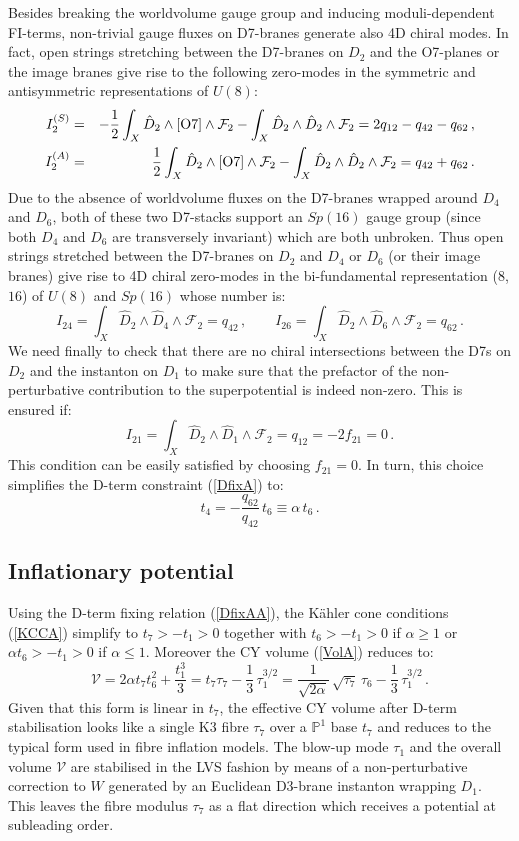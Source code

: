 \documentclass[11pt,a4paper]{article}
\newcommand{\bea}{\begin{eqnarray}}
\newcommand{\eea}{\end{eqnarray}}
\newcommand{\be}{\begin{equation}}
\newcommand{\ee}{\end{equation}}
\newcommand{\mP}{\mathbb{P}}
\newcommand{\F}{\mathcal{F}}
\newcommand\vo{{\mathcal{V}}}
\begin{document}
Besides breaking the worldvolume gauge group and inducing moduli-dependent FI-terms, non-trivial gauge fluxes on D7-branes generate also 4D chiral modes. In fact, open strings stretching between the D7-branes on $D_2$ and the O7-planes or the image branes give rise to the following zero-modes in the symmetric and antisymmetric representations of $U(8)$:
\bea
I_2^{(S)} &=& - \frac12 \int_X \hat{D}_2 \wedge [{\rm O7}] \wedge \F_2 - \int_X \hat{D}_2 \wedge \hat{D}_2 \wedge \F_2 
= 2 q_{12} - q_{42} - q_{62}\,, \\
I_2^{(A)} &=& \frac12 \int_X \hat{D}_2 \wedge [{\rm O7}] \wedge \F_2 - \int_X \hat{D}_2 \wedge \hat{D}_2 \wedge \F_2 = q_{42} + q_{62}\,.
\eea
Due to the absence of worldvolume fluxes on the D7-branes wrapped around $D_4$ and $D_6$, both of these two D7-stacks support an $Sp(16)$ gauge group (since both $D_4$ and $D_6$ are transversely invariant) which are both unbroken. Thus open strings stretched between the D7-branes on $D_2$ and $D_4$ or $D_6$ (or their image branes) give rise to 4D chiral zero-modes in the bi-fundamental representation ($8$,$16$) of $U(8)$ and $Sp(16)$ whose number is:
\be
I_{24} = \int_X \hat{D}_2 \wedge \hat{D}_4 \wedge \F_2 = q_{42}\,, \qquad
I_{26} = \int_X \hat{D}_2 \wedge \hat{D}_6 \wedge \F_2 = q_{62}\,.
\ee
We need finally to check that there are no chiral intersections between the D7s on $D_2$ and the instanton on $D_1$ to make sure that the prefactor of the non-perturbative contribution to the superpotential is indeed non-zero. This is ensured if:
\be
I_{21}=\int_X \hat{D}_2 \wedge \hat{D}_1 \wedge \F_2 = q_{12} =  - 2  f_{21} = 0 \,.
\ee
This condition can be easily satisfied by choosing $f_{21}=0$. In turn, this choice simplifies the D-term constraint (\ref{DfixA}) to:
\be
t_4 = - \frac{q_{62}}{q_{42}}\,t_6 \equiv \alpha \,t_6 \,.
\label{DfixAA}
\ee


\subsection{Inflationary potential}

Using the D-term fixing relation (\ref{DfixAA}), the K\"ahler cone conditions (\ref{KCCA}) simplify to $t_7>-t_1>0$ together with $t_6>-t_1>0$ if $\alpha\geq 1$ or $\alpha t_6>-t_1>0$ if $\alpha\leq 1$. Moreover the CY volume (\ref{VolA}) reduces to:
\be
\vo = 2\alpha t_7 t_6^2 + \frac{t_1^3}{3} = t_7 \tau_7 -\frac13 \,\tau_1^{3/2} = \frac{1}{\sqrt{2\alpha}}\,\sqrt{\tau_7}\,\tau_6-\frac13\,\tau_1^{3/2}\,.
\ee
Given that this form is linear in $t_7$, the effective CY volume after D-term stabilisation looks like a single K3 fibre $\tau_7$ over a $\mP^1$ base $t_7$ and reduces to the typical form used in fibre inflation models. The blow-up mode $\tau_1$ and the overall volume $\vo$ are stabilised in the LVS fashion by means of a non-perturbative correction to $W$ generated by an Euclidean D3-brane instanton wrapping $D_1$. This leaves the fibre modulus $\tau_7$ as a flat direction which receives a potential at subleading order.
\end{document}
